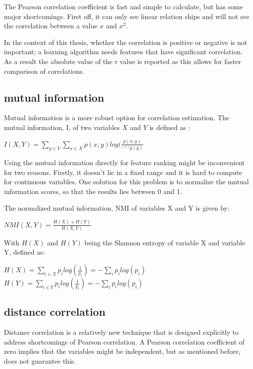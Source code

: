 \npar

The Pearson correlation coefficient is fast and simple to calculate, but has some major shortcomings. First off, it can only see linear relation ships and will not see the correlation between a value $x$ and $x^2$.

\npar

In the context of this thesis, whether the correlation is positive or negative is not important; a learning algorithm needs features that have significant correlation. As a result the absolute value of the r value is reported as this allows for faster comparison of correlations.

\subsection{mutual information}
Mutual information is a more robust option for correlation estimation. The mutual information, I, of two variables $X$ and $Y$ is defined as \citep{mutPaper}:
\begin{center}
$I(X,Y) = \sum\limits_{y\in Y} \sum\limits_{x\in X} p(x,y)log(\frac{p(x,y)}{^(x)p(y)}$
\end{center}

\npar

Using the mutual information directly for feature ranking might be inconvenient for two reasons. Firstly, it doesn't lie in a fixed range and it is hard to compute for continuous variables. One solution for this problem is to normalize the mutual information scores, so that the results lies between 0 and 1.

The normalized mutual information, NMI of variables X and Y is given by:
\begin{center}
$NMI(X,Y) = \frac{H(X) + H(Y)}{H(X,Y)}$
\end{center}
With $H(X)$ and $H(Y)$ being the Shannon entropy of variable X and variable Y, defined as:
\begin{center}
$H(X) = \sum\limits_{i\in X} p_ilog(\frac{1}{p_i}) = - \sum\limits_i p_ilog(p_i)$\\
$H(Y) = \sum\limits_{i\in Y} p_ilog(\frac{1}{p_i}) = - \sum\limits_i p_ilog(p_i)$
\end{center}
\npar


\subsection{distance correlation}
Distance correlation is a relatively new technique that is designed explicitly to address shortcomings of Pearson correlation. A Pearson correlation coefficient of zero implies that the variables might be independent, but as mentioned before, does not guarantee this. 

